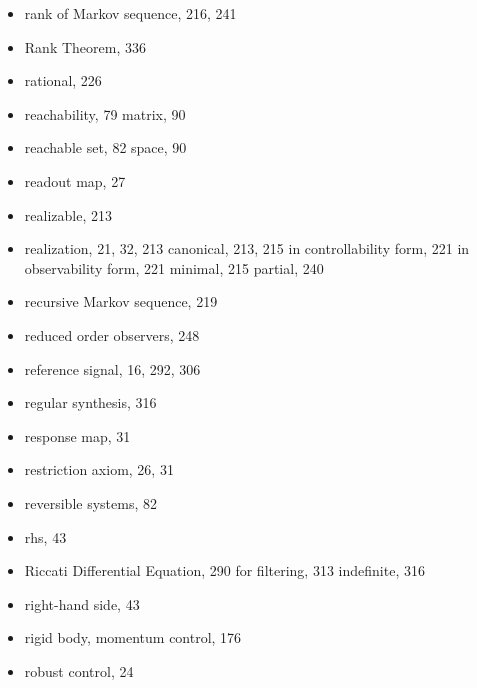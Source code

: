 \begin{itemize}
  \item rank
    \subitem of Markov sequence, 216, 241
  \item Rank Theorem, 336
  \item rational, 226
  \item reachability, 79
    \subitem matrix, 90
  \item reachable
    \subitem set, 82
    \subitem space, 90
  \item readout map, 27
  \item realizable, 213
  \item realization, 21, 32, 213
    \subitem canonical, 213, 215
    \subitem in controllability form, 221
    \subitem in observability form, 221
    \subitem minimal, 215
    \subitem partial, 240
  \item recursive Markov sequence, 219
  \item reduced order observers, 248
  \item reference signal, 16, 292, 306
  \item regular synthesis, 316
  \item response map, 31
  \item restriction axiom, 26, 31
  \item reversible systems, 82
  \item rhs, 43
  \item Riccati Differential Equation, 290
    \subitem for filtering, 313
    \subitem indefinite, 316
  \item right-hand side, 43
  \item rigid body, momentum control, 176
  \item robust control, 24


\end{itemize}
